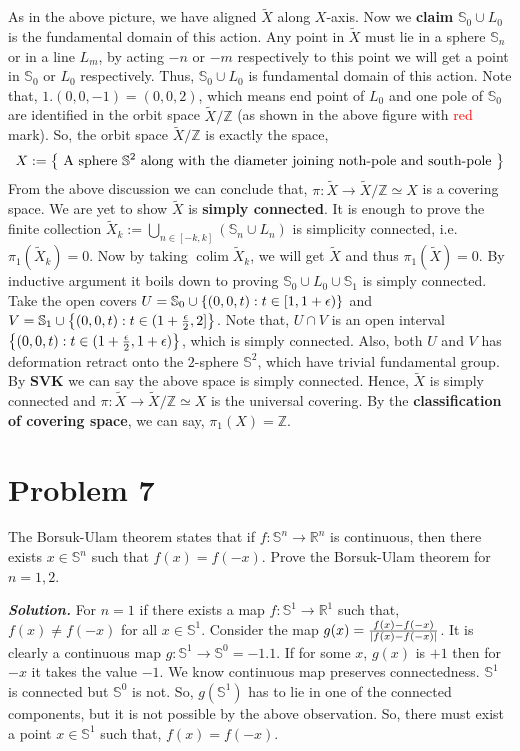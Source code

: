 \documentclass[11pt]{article}
\newcommand{\bb}[1]{\mathbb{#1}}
\newcommand{\Z}{\bb{Z}}
\newcommand{\R}{\mathbb{R}}
\newcommand{\s}{\bb{S}}
\newcommand{\sol}{ \textbf{\textit{Solution.}} }
\begin{document}
\noindent As in the above picture, we have aligned $\tilde{X}$ along $X$-axis. Now we \textbf{claim} $\s_0 \cup L_0$ is the fundamental domain of this action. Any point in $\tilde{X}$ must lie in a sphere $\s_n$ or in a line $L_m$, by acting $-n$ or $-m$ respectively to this point we will get a point in $\s_0$ or $L_0$ respectively. Thus, $\s_0\cup L_0$ is fundamental domain of this action. Note that, $1.(0,0,-1) = (0,0,2)$, which means end point of $L_0$ and one pole of $\s_0$ are identified in the orbit space $\tilde{X}/\Z$ (as shown in the above figure with \textcolor{red}{red} mark). So, the orbit space $\tilde{X}/\Z$ is exactly the space, $$X := \qty{\text{ A sphere } \s^2 \text{ along with the diameter joining noth-pole and south-pole }}$$
From the above discussion we can conclude that, $\pi : \tilde{X} \to \tilde{X}/\Z \simeq X$ is a covering space. We are yet to show $\tilde{X}$ is \textbf{simply connected}. It is enough to prove the finite collection $\tilde{X}_k := \bigcup_{n \in [-k,k]} (\s_n\cup L_n)$ is simplicity connected, i.e. $\pi_1(\tilde{X}_k) = \qty{0}$. Now by taking $\operatorname{colim} \tilde{X}_k$, we will get $\tilde{X}$ and thus $\pi_1(\tilde{X})=\qty{0}$. By inductive argument it boils down to proving $\s_0 \cup L_0 \cup \s_1$ is simply connected. Take the open covers $U = \s_0 \cup \qty{(0,0,t) :t \in [1,1+\epsilon)}$ and $V = \s_1 \cup \qty{(0,0,t) : t \in (1+\frac{\epsilon}{2},2]}$. Note that, $U\cap V$ is an open interval $\qty{(0,0,t): t \in (1+\frac{\epsilon}{2},1+\epsilon)}$, which is simply connected. Also, both $U$ and  $V$ has deformation retract onto the $2$-sphere $\s^2$, which have trivial fundamental group. By \textbf{\textsf{SVK}} we can say the above space is simply connected. Hence, $\tilde{X}$ is simply connected and $\pi : \tilde{X} \to \tilde{X}/\Z \simeq X$ is the universal covering. By the \textbf{\textsf{classification of covering space}}, we can say, $\pi_1(X) = \Z$.


 \section{Problem 7}
 \begin{prob}{}
    The Borsuk-Ulam theorem states that if $f : \s^n \to \R^n$ is continuous, then there exists $x \in \s^n$ such that $f(x) = f(-x)$. Prove the Borsuk-Ulam theorem for $n=1,2$. 
 \end{prob}
 \sol For $n=1$ if there exists a map $f : \s^1 \to \R^1$ such that, $f(x) \neq f(-x)$ for all $x\in \s^1$. Consider the map $g(x) = \frac{f(x)-f(-x)}{\abs{f(x)-f(-x)}}$. It is clearly a continuous map $g : \s^1 \to \s^0=\qty{-1,1}$. If for some $x$, $g(x)$ is $+1$ then for $-x$ it takes the value $-1$. We know continuous map preserves connectedness. $\s^1$ is connected but $\s^0$ is not. So, $g(\s^1)$ has to lie in one of the connected components, but it is not possible by the above observation. So, there must exist a point $x \in \s^1$ such that, $f(x)=f(-x)$. 
 
\end{document}
